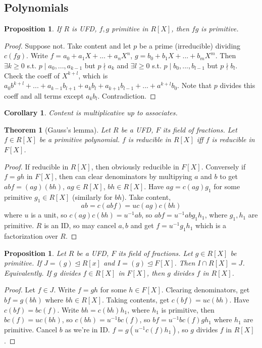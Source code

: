 \documentclass{article}
\theoremstyle{definition}
\theoremstyle{remark}
\theoremstyle{plain}
\newtheorem{thm}[defn]{Theorem}
\newtheorem{prop}[defn]{Proposition}
\newtheorem{crly}[defn]{Corollary}
\theoremstyle{definition}
\begin{document}
\subsection{Polynomials}
\begin{prop}
    If $R$ is UFD, $f,g$ primitive in $R[X]$, then $fg$ is primitive.
\end{prop}
\begin{proof}
    Suppose not. Take content and let $p$ be a prime (irreducible) dividing $c(fg)$. Write $f=a_0+a_1X+...+a_nX^n$, $g=b_0+b_1X+...+b_mX^m$. Then $\exists k\ge 0$ s.t. $p\mid a_0,...,a_{k-1}$ but $p\nmid a_k$ and $\exists l\ge 0$ s.t. $p\mid b_0,...,b_{l-1}$ but $p\nmid b_l$. Check the coeff of $X^{k+l}$, which is $a_0b^{k+l}+...+a_{k-1}b_{l+1}+a_kb_l+a_{k+1}b_{l-1}+...+a^{k+l}b_0$. Note that $p$ divides this coeff and all terms except $a_kb_l$. Contradiction.
\end{proof}
\begin{crly}
    Content is multiplicative up to associates.
\end{crly}
\begin{thm}[Gauss's lemma]
    Let $R$ be a UFD, $F$ its field of fractions. Let $f\in R[X]$ be a primitive polynomial. $f$ is reducible in $R[X]$ iff $f$ is reducible in $F[X]$.
\end{thm}
\begin{proof}
    If reducible in $R[X]$, then obviously reducible in $F[X]$. Conversely if $f=gh$ in $F[X]$, then can clear denominators by multipying $a$ and $b$ to get $abf=(ag)(bh)$, $ag\in R[X]$, $bh\in R[X]$. Have $ag=c(ag)g_1$ for some primitive $g_1\in R[X]$ (similarly for $bh$). Take content,
    \[ab=c(abf)=uc(ag)c(bh)\]
    where $u$ is a unit, so $c(ag)c(bh)=u^{-1}ab$, so 
    $abf=u^{-1}abg_1h_1$, where $g_1,h_1$ are primitive. $R$ is an ID, so may cancel $a,b$ and get $f=u^{-1}g_1h_1$ which is a factorization over $R$.
\end{proof}
\begin{prop}
    Let $R$ be a UFD, $F$ its field of fractions. Let $g\in R[X]$ be primitive. If $J=(g)\trianglelefteq R[x]$ and $I=(g)\trianglelefteq F[X]$. Then $I\cap R[X]=J$. Equivalently. If $g$ divides $f\in R[X]$ in $F[X]$, then $g$ divides $f$ in $R[X]$.
\end{prop}
\begin{proof}
    Let $f\in J$. Write $f=gh$ for some $h\in F[X]$. Clearing denominators, get $bf=g(bh)$ where $bh\in R[X]$. Taking contents, get $c(bf)=uc(bh)$. Have $c(bf)=bc(f)$. Write $bh=c(bh)h_1$, where $h_1$ is primitive, then $bc(f)=uc(bh)$, so $c(bh)=u^{-1}bc(f)$, so $bf=u^{-1}bc(f)gh_1$ where $h_1$ are primitive. Cancel $b$ as we're in ID. $f=g(u^{-1}c(f)h_1)$, so $g$ divides $f$ in $R[X]$. 
\end{proof}
\end{document}
